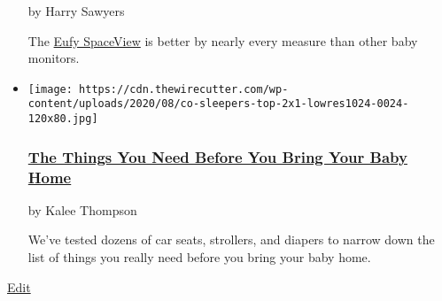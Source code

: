 \begin{itemize}
  by Harry Sawyers

  The
  \href{https://www.nytimes3xbfgragh.onion/wirecutter/out/link/29762/149815/4/86505/?merchant=Amazon}{Eufy
  SpaceView} is better by nearly every measure than other baby monitors.
\item
  \href{https://www.nytimes3xbfgragh.onion/wirecutter/lists/the-things-you-need-before-you-bring-your-baby-home/}{}

  \texttt{[image: https://cdn.thewirecutter.com/wp-content/uploads/2020/08/co-sleepers-top-2x1-lowres1024-0024-120x80.jpg]}

  \hypertarget{the-things-you-need-before-you-bring-your-baby-home}{%
  \subsubsection{\texorpdfstring{\href{https://www.nytimes3xbfgragh.onion/wirecutter/lists/the-things-you-need-before-you-bring-your-baby-home/}{The
  Things You Need Before You Bring Your Baby
  Home}}{The Things You Need Before You Bring Your Baby Home}}\label{the-things-you-need-before-you-bring-your-baby-home}}

  by Kalee Thompson

  We've tested dozens of car seats, strollers, and diapers to narrow
  down the list of things you really need before you bring your baby
  home.
\end{itemize}

\href{https://thewirecutter.com/wp-admin/post.php?post=156052\&action=edit}{Edit}

